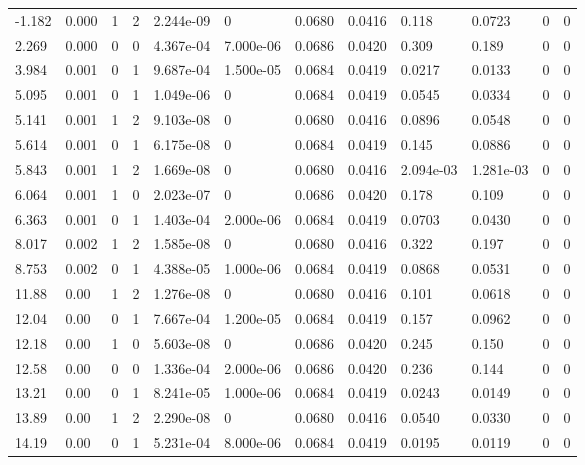 \documentclass[preview]{standalone}
\begin{document}
{{\begin{tabular}{L{1.2cm}C{1.2cm} C{0.3cm}C{0.5cm} C{1.4cm}C{1.4cm} C{1.4cm}C{1.4cm} C{1.6cm}C{1.6cm} C{1.6cm}C{1.6cm}}
  -1.182  &  0.000  & 1     &  2 &  2.244e-09  & 0  &  0.0680&   0.0416& 0.118 & 0.0723   &  0 & 0  \\ 
  2.269  &  0.000  & 0     &  0 &  4.367e-04  & 7.000e-06  &  0.0686&   0.0420& 0.309 & 0.189   &  0 & 0  \\ 
  3.984  &  0.001  & 0     &  1 &  9.687e-04  & 1.500e-05  &  0.0684&   0.0419& 0.0217 & 0.0133   &  0 & 0  \\ 
  5.095  &  0.001  & 0     &  1 &  1.049e-06  & 0  &  0.0684&   0.0419& 0.0545 & 0.0334   &  0 & 0  \\ 
  5.141  &  0.001  & 1     &  2 &  9.103e-08  & 0  &  0.0680&   0.0416& 0.0896 & 0.0548   &  0 & 0  \\ 
  5.614  &  0.001  & 0     &  1 &  6.175e-08  & 0  &  0.0684&   0.0419& 0.145 & 0.0886   &  0 & 0  \\ 
  5.843  &  0.001  & 1     &  2 &  1.669e-08  & 0  &  0.0680&   0.0416& 2.094e-03 & 1.281e-03   &  0 & 0  \\ 
  6.064  &  0.001  & 1     &  0 &  2.023e-07  & 0  &  0.0686&   0.0420& 0.178 & 0.109   &  0 & 0  \\ 
  6.363  &  0.001  & 0     &  1 &  1.403e-04  & 2.000e-06  &  0.0684&   0.0419& 0.0703 & 0.0430   &  0 & 0  \\ 
  8.017  &  0.002  & 1     &  2 &  1.585e-08  & 0  &  0.0680&   0.0416& 0.322 & 0.197   &  0 & 0  \\ 
  8.753  &  0.002  & 0     &  1 &  4.388e-05  & 1.000e-06  &  0.0684&   0.0419& 0.0868 & 0.0531   &  0 & 0  \\ 
  11.88  &  0.00  & 1     &  2 &  1.276e-08  & 0  &  0.0680&   0.0416& 0.101 & 0.0618   &  0 & 0  \\ 
  12.04  &  0.00  & 0     &  1 &  7.667e-04  & 1.200e-05  &  0.0684&   0.0419& 0.157 & 0.0962   &  0 & 0  \\ 
  12.18  &  0.00  & 1     &  0 &  5.603e-08  & 0  &  0.0686&   0.0420& 0.245 & 0.150   &  0 & 0  \\ 
  12.58  &  0.00  & 0     &  0 &  1.336e-04  & 2.000e-06  &  0.0686&   0.0420& 0.236 & 0.144   &  0 & 0  \\ 
  13.21  &  0.00  & 0     &  1 &  8.241e-05  & 1.000e-06  &  0.0684&   0.0419& 0.0243 & 0.0149   &  0 & 0  \\ 
  13.89  &  0.00  & 1     &  2 &  2.290e-08  & 0  &  0.0680&   0.0416& 0.0540 & 0.0330   &  0 & 0  \\ 
  14.19  &  0.00  & 0     &  1 &  5.231e-04  & 8.000e-06  &  0.0684&   0.0419& 0.0195 & 0.0119   &  0 & 0  \\ 

\end{tabular}}}
\end{document}

